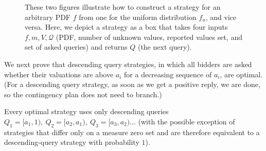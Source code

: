 \begin{figure}
\centering
  \caption{These two figures illustrate how to construct a strategy for an
    arbitrary PDF $f$ from one for the uniform distribution $f_u$, and vice versa.
Here, we depict a strategy as a box that takes four inputs $f, m, V,
  \mathcal Q$ (PDF, number of unknown values, reported values set, and set of asked
  queries) and returns $Q$ (the next query).} \label{fig:uniform}
\end{figure}

We next prove that descending query strategies, in which all bidders are
asked whether their valuations are above $a_i$ for a decreasing sequence of
$a_i$, are optimal.  (For a descending query strategy, as soon as we get a
positive reply, we are done, so the contingency plan does not need to branch.)

\begin{lemma}\label{lemma:descending}
Every optimal strategy 
uses only 
descending queries
$Q_1 = [a_1, 1), ~Q_2 = [a_2, a_1), ~Q_3 = [a_3, a_2)\ldots$
(with the possible exception of strategies that differ only on a measure
zero set
and are therefore equivalent to a descending-query strategy with
probability $1$).
\end{lemma}

